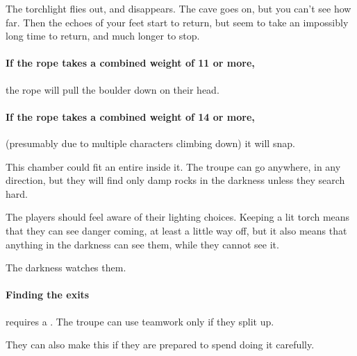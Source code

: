 \begin{multicols}{2}
\begin{boxtext}
  The torchlight flies out, and disappears.
  The cave goes on, but you can't see how far.
  Then the echoes of your feet start to return, but seem to take an impossibly long time to return, and much longer to stop.
\end{boxtext}

\paragraph{If the rope takes a combined \gls{weight} of 11 or more,}
the rope will pull the boulder down on their head.

\paragraph{If the rope takes a combined \gls{weight} of 14 or more,}
(presumably due to multiple characters climbing down) it will snap.


This chamber could fit an entire  inside it.
The troupe can go anywhere, in any direction, but they will find only damp rocks in the darkness unless they search hard.


The players should feel aware of their lighting choices.
Keeping a lit torch means that they can see danger coming, at least a little way off, but it also means that anything in the darkness can see them, while they cannot see it.

The darkness watches them.

\paragraph{Finding the exits}
requires a .
The troupe can use teamwork%
only if they split up.

They can also make this %
if they are prepared to spend  doing it carefully.


\end{multicols}
